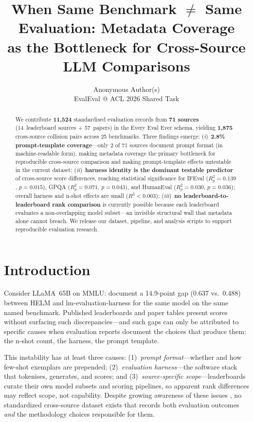 \documentclass[11pt]{article}
\title{When Same Benchmark $\neq$ Same Evaluation: Metadata Coverage\\
as the Bottleneck for Cross-Source LLM Comparisons}
\author{Anonymous Author(s)\\
  EvalEval @ ACL 2026 Shared Task}
\begin{document}
\maketitle

\begin{abstract}
We contribute \textbf{11,524} standardised evaluation records from
\textbf{71 sources} (14~leaderboard sources + 57~papers) in the Every Eval
Ever schema, yielding \textbf{1,875} cross-source collision pairs across 25
benchmarks.
Three findings emerge:
(\textit{i})~\textbf{2.8\% prompt-template coverage}---only 2 of 71
sources document prompt format (in machine-readable form), making metadata
coverage the primary bottleneck for reproducible cross-source comparison
and making prompt-template effects untestable in the current dataset;
(\textit{ii})~\textbf{harness identity is the dominant testable predictor}
of cross-source score differences, reaching statistical significance for
IFEval ($R^2_p\!=\!0.139$, $p\!=\!0.015$), GPQA ($R^2_p\!=\!0.071$,
$p\!=\!0.043$), and HumanEval ($R^2_p\!=\!0.030$, $p\!=\!0.036$);
overall harness and n-shot effects are small ($R^2\!<\!0.003$);
(\textit{iii})~\textbf{no leaderboard-to-leaderboard rank comparison}
is currently possible because each leaderboard evaluates a
non-overlapping model subset---an invisible structural wall that
metadata alone cannot breach.
We release our dataset, pipeline, and analysis scripts to support
reproducible evaluation research.
\end{abstract}

\section{Introduction}

Consider LLaMA~65B on MMLU: \citet{alzahrani-2024-benchmarks} document
a 14.9-point gap (0.637 vs.\ 0.488) between HELM and lm-evaluation-harness
for the same model on the same named benchmark.
Published leaderboards and paper tables present scores without
surfacing such discrepancies---and such gaps can only be attributed
to specific causes when evaluation reports document the choices that
produce them: the n-shot count, the harness, the prompt template.

This instability has at least three causes: (1)~\emph{prompt format}---whether
and how few-shot exemplars are prepended; (2)~\emph{evaluation harness}---the
software stack that tokenises, generates, and scores; and
(3)~\emph{source-specific scope}---leaderboards curate their own model subsets
and scoring pipelines, so apparent rank differences may reflect scope, not
capability.
Despite growing awareness of these issues
\citep{biderman-2024-lessons, polo-2024-tinybenchmarks},
no standardized cross-source dataset exists that records both evaluation
outcomes \emph{and} the methodology choices responsible for them.
\end{document}
